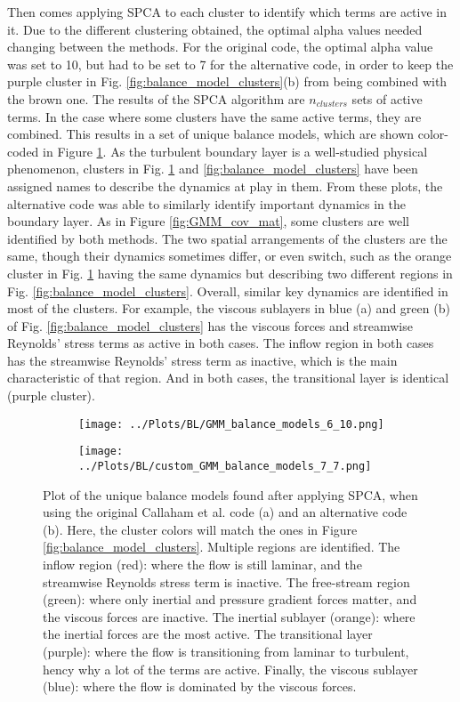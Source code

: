 \documentclass[12pt]{report} %
\begin{document}
Then comes applying SPCA to each cluster to identify which terms are active in it. Due to the different clustering obtained, the optimal alpha values needed changing between the methods. For the original code, the optimal alpha value was set to 10, but had to be set to 7 for the alternative code, in order to keep the purple cluster in Fig. \ref{fig:balance_model_clusters}(b) from being combined with the brown one. The results of the SPCA algorithm are $n_{clusters}$ sets of active terms. In the case where some clusters have the same active terms, they are combined. This results in a set of unique balance models, which are shown color-coded in Figure \ref{fig:balance_models}. As the turbulent boundary layer is a well-studied physical phenomenon, clusters in Fig. \ref{fig:balance_models} and \ref{fig:balance_model_clusters} have been assigned names to describe the dynamics at play in them. From these plots, the alternative code was able to similarly identify important dynamics in the boundary layer. As in Figure \ref{fig:GMM_cov_mat}, some clusters are well identified by both methods. The two spatial arrangements of the clusters are the same, though their dynamics sometimes differ, or even switch, such as the orange cluster in Fig. \ref{fig:balance_models} having the same dynamics but describing two different regions in Fig. \ref{fig:balance_model_clusters}. Overall, similar key dynamics are identified in most of the clusters. For example, the viscous sublayers in blue (a) and green (b) of Fig. \ref{fig:balance_model_clusters} has the viscous forces and streamwise Reynolds’ stress terms as active in both cases. The inflow region in both cases has the streamwise Reynolds’ stress term as inactive, which is the main characteristic of that region. And in both cases, the transitional layer is identical (purple cluster).


\begin{figure}[htbp]
  \centering
  \begin{subfigure}[b]{0.45\textwidth}
      \texttt{[image: ../Plots/BL/GMM\_balance\_models\_6\_10.png]}
      \caption{}
  \end{subfigure}
  \hfill
  \begin{subfigure}[b]{0.45\textwidth}
      \texttt{[image: ../Plots/BL/custom\_GMM\_balance\_models\_7\_7.png]}
      \caption{}
  \end{subfigure}
  \caption{Plot of the unique balance models found after applying SPCA, when using the original Callaham et al. code (a) and an alternative code (b). Here, the cluster colors will match the ones in Figure \ref{fig:balance_model_clusters}. Multiple regions are identified. The inflow region (red): where the flow is still laminar, and the streamwise Reynolds stress term is inactive. The free-stream region (green): where only inertial and pressure gradient forces matter, and the viscous forces are inactive. The inertial sublayer (orange): where the inertial forces are the most active. The transitional layer (purple): where the flow is transitioning from laminar to turbulent, hency why a lot of the terms are active. Finally, the viscous sublayer (blue): where the flow is dominated by the viscous forces.}
  \label{fig:balance_models}
\end{figure}
\end{document}

